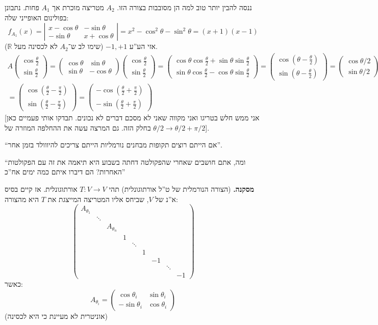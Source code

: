 \documentclass[a4paper]{article}
\newcommand\R     {\mathbb{R}}
\newcommand\ta    {\theta}
\newcommand\co        {\colon}
\newcommand\pms[1]    {\begin{pmatrix}
		#1
\end{pmatrix}}
\newcommand\sof[1]    {\left | #1 \right |}
\newcommand\cl [1]    {\left ( #1 \right )}
\theoremstyle{definition}
\begin{document}
	ננסה להבין יותר טוב למה הן מסובבות בצורה הזו. $A_2$ מטריצה מוכרת אך $A_1$ פחות. נתבונן בפולינום האופייני שלה: 
	\[ f_{A_1}(x) = \sof{\begin{matrix}
			x - \cos\ta & -\sin\ta \\ -\sin\ta & x + \cos\ta
	\end{matrix}} = x^2 - \cos^2 \ta - \sin^2\ta = (x + 1)(x - 1) \]
	אזי הע''ע $-1, +1$ (שימו לב ש־$A_2$ לא לכסינה מעל $\R$). 
	\begin{multline*}
		A\pms{\cos\frac{\ta}{2}\\\sin\frac{\ta}{2}} = \pms{\cos\ta & \sin\ta \\ \sin\ta & -\cos\ta} \pms{\cos\frac{\ta}{2} \\ \sin\frac{\ta}{2}} = \pms{\cos \ta \cos \frac{\ta}{2} + \sin\ta \sin\frac{\ta}{2} \\ \sin\ta\cos\frac{\ta}{2} - \cos\ta\sin\frac{\ta}{2}} = \pms{\cos\cl{\ta - \frac{\ta}{2}} \\ \sin\cl{\ta - \frac{\ta}{2}}} = \pms{\cos\ta/2 \\ \sin\ta/2} \quad \cl{\frac{\ta}{2} \mapsto \frac{\ta}{2} + \pi} \\
		= \pms{\cos\cl{\frac{\ta}{2} - \frac{\pi}{2}} \\ \sin\cl{\frac{\ta}{2} - \frac{\pi}{2}}} = \pms{-\cos\cl{\frac{\ta}{2} + \frac{\pi}{2}} \\ -\sin\cl{\frac{\ta}{2} + \frac{\pi}{2}}} 
	\end{multline*}
	[אני ממש חלש בטריגו ואני מקווה שאני לא מסכם דברים לא נכונים. תבדקו אותי פעמיים כאן בחלק הזה. גם המרצה עשה את ההחלפה המוזרה של $\ta/2 \to \ta/2 + \pi/2$]. 
	
	``אם הייתם רוצים תקופות מבחנים נורמליות הייתם צריכים להיווולד בזמן אחר''. 
	
	``ומה, אתם חושבים שאחרי שהפקולטה דחתה בשבוע היא תיאמה את זה עם הפקולטות האחרות? הם דיברו איתם כמה ימים אח''כ''
	
	\textbf{מסקנה. }(הצורה הנורמלית של ט''ל אורתוגונלית) תהי $T \co V \to V$ אורתוגונלית. אז קיים בסיס א''נ של $V$, שביחס אליו המטריצה המייצגת את $T$ היא מהצורה: 
	\[ \pms{A_{\ta_1} \\ &\ddots \\ &&A_{\ta_n} \\ &&& 1 \\ &&&&\ddots \\ &&&&&1 \\ &&&&&&-1 \\ &&&&&&& \ddots \\ &&&&&&&&-1} \]
	כאשר: 
	\[ A_{\ta_i} = \pms{\cos \ta_i & \sin \ta_i \\ -\sin \ta_i & \cos \ta_i} \]
	(אוניטרית לא מעיינת כי היא לכסינה)
	
\end{document}
